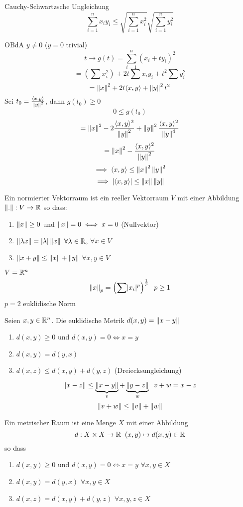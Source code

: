 \begin{Sat}{Cauchy-Schwartzsche Ungleichung}
  \[\sum^n_{i=1}x_iy_i\leq\sqrt{\sum_{i=1}^nx_i^2}\sqrt{\sum_{i=1}^ny_i^2}\]
\end{Sat}
\begin{Bew}
  OBdA $y\neq 0$ ($y=0$ trivial)
  \[t\to g(t)=\sum_{i=1}^n(x_i+ty_i)^2\]
  \[=\left( \sum x_i^2 \right)+2t\sum x_iy_i+t^2\sum y_i^2\]
  \[=\left\| x \right\|^2+2t\langle x,y \rangle+\left\| y \right\|^2t^2\]
  Sei $t_0=\frac{\langle x,y \rangle}{\left\| y \right\|^2}$, dann $g(t_0)\geq 0$
  \[0\leq g(t_0)\]
  \[=\left\| x \right\|^2-2\frac{\langle x,y \rangle^2}{\left\| y \right\|^2}+\left\| y \right\|^2\frac{\langle x,y \rangle^2}{\left\| y \right\|^4}\]
  \[=\left\| x \right\|^2-\frac{\langle x,y \rangle^2}{\left\| y \right\|^2}\]
  \[\implies \langle x,y \rangle\leq\left\| x \right\|^2\left\| y \right\|^2\]
  \[\implies \mathopen| \langle x,y \rangle \mathclose|\leq\left\| x \right\|\left\| y \right\|\]
\end{Bew}
\begin{Def}
  Ein normierter Vektorraum ist ein reeller Vektorraum $V$ mit einer Abbildung $\left\| . \right\| :V\to\mathbb{R}$ so dass:
  \begin{enumerate}
    \item $\left\| x \right\|\geq 0$ und $\left\| x \right\|=0\iff x=0$ (Nullvektor)
    \item $\left\| \lambda x \right\|=\mathopen| \lambda \mathclose|\left\| x \right\|$ $\forall \lambda\in\mathbb{R}$, $\forall x\in V$
    \item $\left\| x+y \right\|\leq\left\| x \right\|+\left\| y \right\|$ $\forall x,y\in V$
  \end{enumerate}
\end{Def}
\begin{Bsp}
  $V=\mathbb{R}^n$
  \[\left\| x \right\|_p=\left(\sum\mathopen| x_i \mathclose|^p\right)^{\frac{1}{p}}\hspace{2mm} p\geq 1\]
  $p=2$ euklidische Norm
\end{Bsp}
\begin{Def}
  Seien $x,y\in\mathbb{R}^n$. Die euklidische Metrik $d(x,y)=\left\| x-y \right\|$
\end{Def}
\begin{Lem}
  \begin{enumerate}
    \item $d(x,y)\geq 0$ und $d(x,y)=0\iff x=y$
    \item $d(x,y)=d(y,x)$
    \item $d(x,z)\leq d(x,y)+d(y,z)$ (Dreiecksungleichung)
  \end{enumerate}
\end{Lem}
\begin{Bew}
  \[\left\| x-z \right\|\leq\underbrace{\left\| x-y \right\|}_v+\underbrace{\left\| y-z \right\|}_w\hspace{2mm} v+w=x-z\]
  \[\left\| v+w \right\|\leq\left\| v \right\|+\left\| w \right\|\]
\end{Bew}
\begin{Def}
  Ein metrischer Raum ist eine Menge $X$ mit einer Abbildung
  \[d:X\times X\to\mathbb{R}\hspace{2mm} (x,y)\mapsto d(x,y)\in\mathbb{R}\]so dass
  \begin{enumerate}
    \item $d(x,y)\geq 0$ und $d(x,y)=0\iff x=y$ $\forall x,y\in X$
    \item $d(x,y)=d(y,x)$ $\forall x,y\in X$
    \item $d(x,z)=d(x,y)+d(y,z)$ $\forall x,y,z\in X$
  \end{enumerate}
\end{Def}
